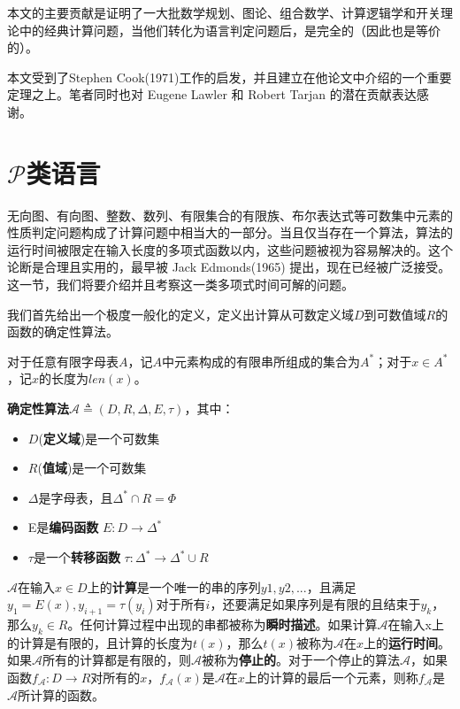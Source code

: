 \documentclass[twocolumn]{article}
\theoremstyle{nonumberplain}%
\begin{document}
    本文的主要贡献是证明了一大批数学规划、图论、组合数学、计算逻辑学和开关理论中的经典计算问题，当他们转化为语言判定问题后，是完全的（因此也是等价的）。

    本文受到了Stephen Cook(1971)工作的启发，并且建立在他论文中介绍的一个重要定理之上。笔者同时也对 Eugene Lawler 和 Robert Tarjan 的潜在贡献表达感谢。

\section{$\mathcal{P}$类语言}
    无向图、有向图、整数、数列、有限集合的有限族、布尔表达式等可数集中元素的性质判定问题构成了计算问题中相当大的一部分。当且仅当存在一个算法，算法的运行时间被限定在输入长度的多项式函数以内，这些问题被视为容易解决的。这个论断是合理且实用的，最早被 Jack Edmonds(1965) 提出，现在已经被广泛接受。这一节，我们将要介绍并且考察这一类多项式时间可解的问题。

    我们首先给出一个极度一般化的定义，定义出计算从可数定义域$D$到可数值域$R$的函数的确定性算法。

    对于任意有限字母表$A$，记$A$中元素构成的有限串所组成的集合为$A^*$；对于$x\in A^*$，记$x$的长度为$len(x)$。

    {\bf 确定性算法}$\mathcal{A}\triangleq(D,R,\Delta,E,\tau)$，其中：
    \begin{itemize}
    \item $D$({\bf 定义域})是一个可数集
    \item $R$({\bf 值域})是一个可数集
    \item $\Delta$是字母表，且$\Delta^*\cap R=\Phi$
    \item E是{\bf 编码函数} $E:D\rightarrow\Delta^*$
    \item $\tau$是一个{\bf 转移函数 }$\tau:\Delta^*\rightarrow\Delta^*\cup R$
    \end{itemize}

    $\mathcal{A}$在输入$x\in D$上的{\bf 计算}是一个唯一的串的序列$y1,y2,...$，且满足$y_1=E(x),y_{i+1}=\tau(y_i)$对于所有$i$，还要满足如果序列是有限的且结束于$y_k$，那么$y_k\in R$。任何计算过程中出现的串都被称为{\bf 瞬时描述}。如果计算$\mathcal{A}$在输入x上的计算是有限的，且计算的长度为$t(x)$，那么$t(x)$被称为$\mathcal{A}$在$x$上的{\bf 运行时间}。如果$\mathcal{A}$所有的计算都是有限的，则$\mathcal{A}$被称为{\bf 停止的}。对于一个停止的算法$\mathcal{A}$，如果函数$f_\mathcal{A}:D\rightarrow R$对所有的$x$，$f_\mathcal{A}(x)$是$\mathcal{A}$在$x$上的计算的最后一个元素，则称$f_\mathcal{A}$是$\mathcal{A}$所计算的函数。
\end{document}
